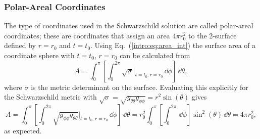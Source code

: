 \subsubsection*{Polar-Areal Coordinates }
The type of coordinates used in the Schwarzschild solution are called polar-areal coordinates; these are coordinates that assign an area $4\pi r_0^2$ to the 2-surface defined by $r=r_0$ and $t=t_0$. Using Eq.~(\ref{intro:eq:area_int}) the surface area of a coordinate sphere with $t=t_0$, $r=r_0$ can be calculated from
\begin{equation}
A=\int_0^\pi\left[\int_0^{2\pi} \sqrt{\sigma}\Big|_{t=t_0,r=r_0} \,\dd \phi\right] \,\dd \theta,
\end{equation}
where $\sigma$ is the metric determinant on the surface. Evaluating this explicitly for the Schwarzschild metric with $\sqrt{\sigma} = \sqrt{g_{\theta\theta}  g_{\phi\phi}} = r^2 \sin(\theta)$ gives
\begin{equation}
A=\int_0^\pi\left[\int_0^{2\pi} \sqrt{g_{\phi\phi} g_{\theta\theta}}\Big|_{t=t_0,r=r_0} \,\dd \phi\right] \,\dd \theta=  r_0^2 \int_0^\pi\left[\int_0^{2\pi} \,\dd \phi\right]  \sin^2(\theta)\,\dd \theta = 4 \pi r_0^2,
\end{equation}
as expected.




